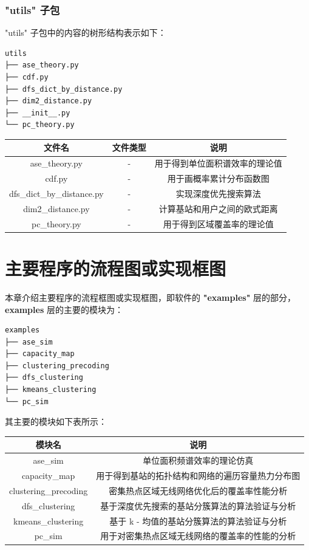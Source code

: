 \documentclass[11pt]{article}
\begin{document}
\subsubsection{"utils" 子包}\label{utils-ux5b50ux5305}

"utils" 子包中的内容的树形结构表示如下：

\begin{verbatim}
utils
├── ase_theory.py
├── cdf.py
├── dfs_dict_by_distance.py
├── dim2_distance.py
├── __init__.py
└── pc_theory.py
\end{verbatim}

\begin{longtable}[c]{@{}ccc@{}}
\toprule
文件名 & 文件类型 & 说明\tabularnewline
\midrule
\endhead
ase\_theory.py & - & 用于得到单位面积谱效率的理论值\tabularnewline
cdf.py & - & 用于画概率累计分布函数图\tabularnewline
dfs\_dict\_by\_distance.py & - & 实现深度优先搜索算法\tabularnewline
dim2\_distance.py & - & 计算基站和用户之间的欧式距离\tabularnewline
pc\_theory.py & - & 用于得到区域覆盖率的理论值\tabularnewline
\bottomrule
\end{longtable}

    \section{主要程序的流程图或实现框图}\label{ux4e3bux8981ux7a0bux5e8fux7684ux6d41ux7a0bux56feux6216ux5b9eux73b0ux6846ux56fe}

本章介绍主要程序的流程框图或实现框图，即软件的 \textbf{"examples"}
层的部分， \textbf{examples} 层的主要的模块为：

\begin{verbatim}
examples
├── ase_sim
├── capacity_map
├── clustering_precoding
├── dfs_clustering
├── kmeans_clustering
└── pc_sim
\end{verbatim}

其主要的模块如下表所示：

\begin{longtable}[c]{@{}cc@{}}
\toprule
模块名 & 说明\tabularnewline
\midrule
\endhead
ase\_sim & 单位面积频谱效率的理论仿真\tabularnewline
capacity\_map &
用于得到基站的拓扑结构和网络的遍历容量热力分布图\tabularnewline
clustering\_precoding &
密集热点区域无线网络优化后的覆盖率性能分析\tabularnewline
dfs\_clustering &
基于深度优先搜索的基站分簇算法的算法验证与分析\tabularnewline
kmeans\_clustering & 基于 k -
均值的基站分簇算法的算法验证与分析\tabularnewline
pc\_sim & 用于对密集热点区域无线网络的覆盖率的性能的分析\tabularnewline
\bottomrule
\end{longtable}
\end{document}
